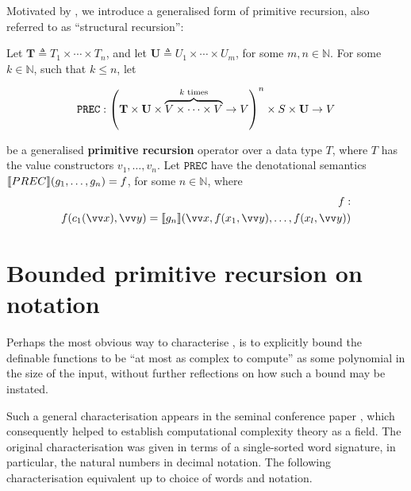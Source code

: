 
Motivated by \cite{leivant-1995}, we introduce a generalised form of primitive
recursion, also referred to as ``structural recursion''\cite{hofmann-2002}:

 

\begin{definition} Let $\mathbf{T} \triangleq T_1 \times \cdots \times T_n$,
and let $\mathbf{U} \triangleq U_1 \times \cdots \times U_m$, for some $m, n
\in \mathbb{N}$. For some $k \in \mathbb{N}$, such that $k\leq n$, let

$$\mathtt{PREC} : {\mathopen{}\left({\mathbf{T} \times \mathbf{U} \times \overbrace{V \times
\cdots \times V}^{\text{$k$ times}} \rightarrow V}\right)\mathclose{}}^n \times S \times \mathbf{U}
\rightarrow V$$

be a generalised \textbf{primitive recursion} operator over a data type $T$,
where $T$ has the value constructors $v_1,\ldots,v_n$. Let $\mathtt{PREC}$ have
the denotational semantics ${\mathopen{}\left\llbracket{PREC}\right\rrbracket\mathclose{}}{\mathopen{}\left({g_1,\ldots,g_n}\right)\mathclose{}} = f$, for some $n \in
\mathbb{N}$, where\begin{align*}
%
f : \\
%
f\p{c_1\p{\vect{x}},\vect{y}} = \sem{g_n}\p{\vect{x}, f\p{x_1,
\vect{y}},\ldots, f\p{x_l, \vect{y}}}
%
\end{align*}

\end{definition}






\section{Bounded primitive recursion on notation}

Perhaps the most obvious way to characterise \FPTIME{}, is to explicitly bound
the definable functions to be ``at most as complex to compute'' as some
polynomial in the size of the input, without further reflections on how such a
bound may be instated.

Such a general characterisation appears in the seminal conference paper
\cite{cobham-1965}, which consequently helped to establish computational
complexity theory as a field\cite{clote-1999}. The original characterisation
was given in terms of a single-sorted word signature, in particular, the
natural numbers in decimal notation. The following characterisation equivalent
up to choice of words and notation. 

